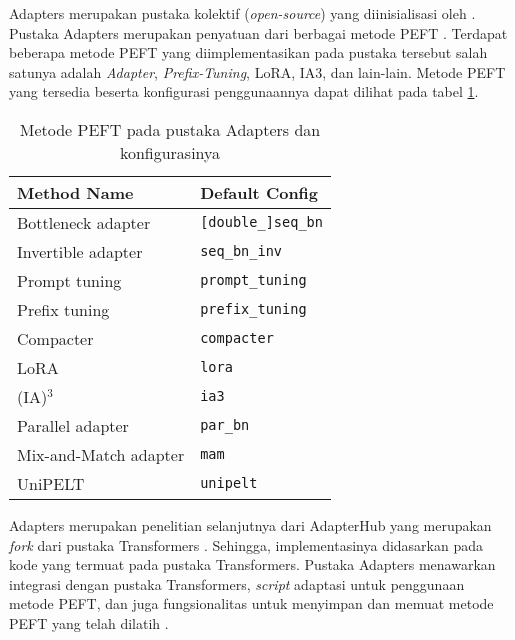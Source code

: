 Adapters merupakan pustaka kolektif (\textit{open-source}) yang diinisialisasi oleh \citeauthor{adapters}. Pustaka Adapters merupakan penyatuan dari berbagai metode PEFT \parencite{adapters}. Terdapat beberapa metode PEFT yang diimplementasikan pada pustaka tersebut salah satunya adalah \textit{Adapter}, \textit{Prefix-Tuning}, LoRA, IA3, dan lain-lain. Metode PEFT yang tersedia beserta konfigurasi penggunaannya dapat dilihat pada tabel \ref{table:adapters-method}. 

\begin{table}[h]
    \vspace{0.25cm}
    \centering
    \caption{Metode PEFT pada pustaka Adapters dan konfigurasinya \parencite{adapters}}
    \label{table:adapters-method}
    \begin{tabular}{ll}
        \toprule
        \textbf{Method Name} & \textbf{Default Config} \\
        \midrule
        Bottleneck adapter \parencite{adapter_houlsby} & \texttt{[double\_]seq\_bn} \\
        Invertible adapter \parencite{adapter_pfeiffer} & \texttt{seq\_bn\_inv} \\
        Prompt tuning \parencite{prompt_tuning} & \texttt{prompt\_tuning} \\
        Prefix tuning \parencite{prefix_tuning} & \texttt{prefix\_tuning} \\
        Compacter \parencite{compacter} & \texttt{compacter} \\
        LoRA \parencite{lora} & \texttt{lora} \\
        (IA)$^3$ \parencite{ia3} & \texttt{ia3} \\
        Parallel adapter \parencite{uvpl} & \texttt{par\_bn} \\
        Mix-and-Match adapter \parencite{uvpl} & \texttt{mam} \\
        UniPELT \parencite{unipelt} & \texttt{unipelt} \\
        \bottomrule
    \end{tabular}
\end{table}

Adapters merupakan penelitian selanjutnya dari AdapterHub yang merupakan \textit{fork} dari pustaka Transformers \parencite{adapters}. Sehingga, implementasinya didasarkan pada kode yang termuat pada pustaka Transformers. Pustaka Adapters menawarkan integrasi dengan pustaka Transformers, \textit{script} adaptasi untuk penggunaan metode PEFT, dan juga fungsionalitas untuk menyimpan dan memuat metode PEFT yang telah dilatih \parencite{adapters}.

